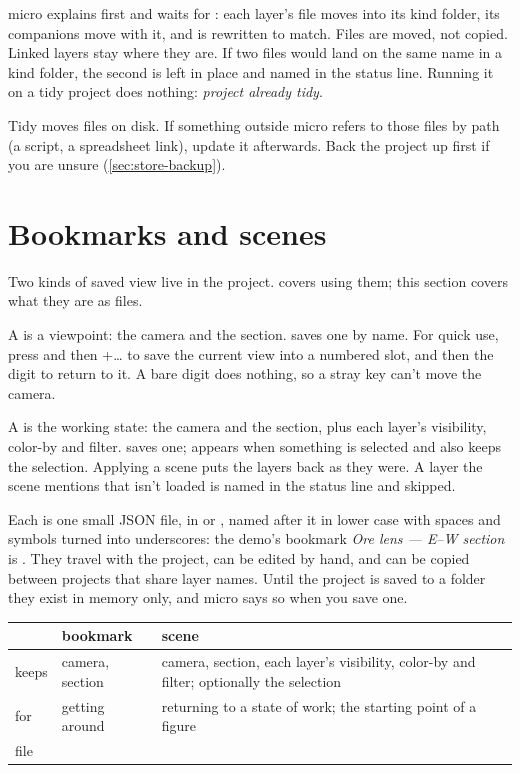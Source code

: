 micro explains first and waits for : each layer's file moves into its kind folder, its companions move with it, and  is rewritten to match. Files are moved, not copied. Linked layers stay where they are. If two files would land on the same name in a kind folder, the second is left in place and named in the status line. Running it on a tidy project does nothing: \emph{project already tidy}.

\begin{caution}
Tidy moves files on disk. If something outside micro refers to those files by path (a script, a spreadsheet link), update it afterwards. Back the project up first if you are unsure (\cref{sec:store-backup}).
\end{caution}

\section{Bookmarks and scenes}\label{sec:projects-views}
Two kinds of saved view live in the project.  covers using them; this section covers what they are as files.

A  is a viewpoint: the camera and the section.  saves one by name. For quick use, press  and then +… to save the current view into a numbered slot, and  then the digit to return to it. A bare digit does nothing, so a stray key can't move the camera.

A  is the working state: the camera and the section, plus each layer's visibility, color-by and filter.  saves one;  appears when something is selected and also keeps the selection. Applying a scene puts the layers back as they were. A layer the scene mentions that isn't loaded is named in the status line and skipped.

Each is one small JSON file, in  or , named after it in lower case with spaces and symbols turned into underscores: the demo's bookmark \emph{Ore lens — E–W section} is . They travel with the project, can be edited by hand, and can be copied between projects that share layer names. Until the project is saved to a folder they exist in memory only, and micro says so when you save one.

\begin{tabularx}{\linewidth}{@{}lLL@{}}\toprule
& bookmark & scene \\ \midrule
keeps & camera, section & camera, section, each layer's visibility, color-by and filter; optionally the selection \\
for & getting around & returning to a state of work; the starting point of a figure \\
file &  &  \\
\bottomrule
\end{tabularx}


